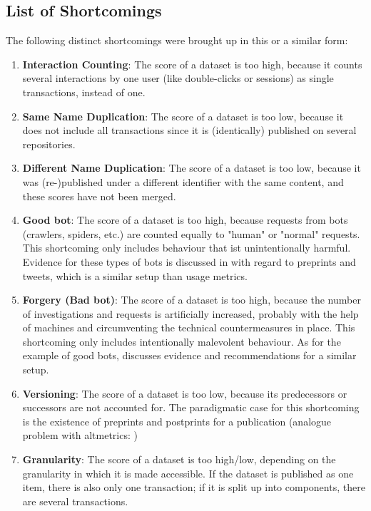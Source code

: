 \documentclass[conference, a4paper]{IEEEtran}\usepackage[]{graphicx}\usepackage[]{color}
\begin{document}
\subsection{List of Shortcomings}

The following distinct shortcomings were brought up in this or a similar form:

\begin{enumerate}
\item \textbf{Interaction Counting}: The score of a dataset is too high,
because it counts several interactions by one user (like double-clicks or sessions)
as single transactions, instead of one.
\item \textbf{Same Name Duplication}: The score of a dataset is too low,
because it does not include all transactions since it is (identically) published on several repositories.
\item \textbf{Different Name Duplication}: The score of a dataset is too low,
because it was (re-)published under a different identifier with the same content,
and these scores have not been merged.
\item \textbf{Good bot}: The score of a dataset is too high,
because requests from bots (crawlers, spiders, etc.) are counted equally to "human"
or "normal" requests.
This shortcoming only includes behaviour that ist unintentionally harmful.
Evidence for these types of bots is discussed in \cite{sh042} with regard
to preprints and tweets, which is a similar setup than usage metrics.
\item \textbf{Forgery (Bad bot)}: The score of a dataset is too high,
because the number of investigations and requests is artificially increased,
probably with the help of machines and circumventing the technical countermeasures in place.
This shortcoming only includes intentionally malevolent behaviour.
As for the example of good bots, \cite{sh042} discusses evidence and recommendations
for a similar setup.
\item \textbf{Versioning}: The score of a dataset is too low,
because its predecessors or successors are not accounted for.
The paradigmatic case for this shortcoming is the existence of preprints and postprints for a publication
(analogue problem with altmetrics: \cite{sh059})
\item \textbf{Granularity}: The score of a dataset is too high/low,
depending on the granularity in which it is made accessible.
If the dataset is published as one item, there is also only one transaction;
if it is split up into components, there are several transactions.

\end{enumerate}
\end{document}
